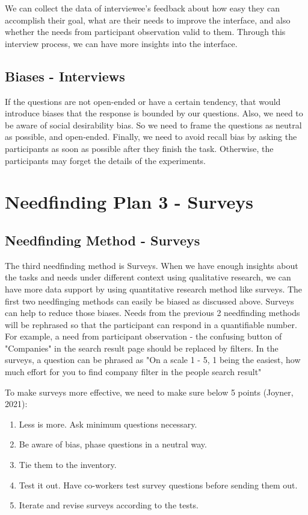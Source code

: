 \documentclass[
	letterpaper, %
]{jdf}
\begin{document}
We can collect the data of interviewee's feedback about how easy they can accomplish their goal, what are their needs to improve the interface, and also whether the needs from participant observation valid to them. Through this interview process, we can have more insights into the interface.

\subsection{Biases - Interviews}
If the questions are not open-ended or have a certain tendency, that would introduce biases that the response is bounded by our questions. Also, we need to be aware of social desirability bias. So we need to frame the questions as neutral as possible, and open-ended. Finally, we need to avoid recall bias by asking the participants as soon as possible after they finish the task. Otherwise, the participants may forget the details of the experiments.

\section{Needfinding Plan 3 - Surveys}
\subsection{Needfinding Method - Surveys}
The third needfinding method is Surveys. When we have enough insights about the tasks and needs under different context using qualitative research, we can have more data support by using quantitative research method like surveys. The first two needfinging methods can easily be biased as discussed above. Surveys can help to reduce those biases. Needs from the previous 2 needfinding methods will be rephrased so that the participant can respond in a quantifiable number. For example, a need from participant observation - the confusing button of "Companies" in the search result page should be replaced by filters. In the surveys, a question can be phrased as "On a scale 1 - 5, 1 being the easiest, how much effort for you to find company filter in the people search result"

To make surveys more effective, we need to make sure below 5 points (Joyner, 2021):
\begin{enumerate}
	\item Less is more. Ask minimum questions necessary.
	\item Be aware of bias, phase questions in a neutral way.
	\item Tie them to the inventory.
	\item Test it out. Have co-workers test survey questions before sending them out.
	\item Iterate and revise surveys according to the tests.
\end{enumerate}
\end{document}
